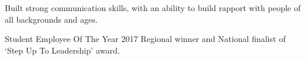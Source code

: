 \begin{tightemize}
  \item Built strong communication skills, with an ability to build rapport with people of all backgrounds and ages.
  \item Student Employee Of The Year 2017 Regional winner and National finalist of `Step Up To Leadership' award.
\end{tightemize}
\sectionsep{}
